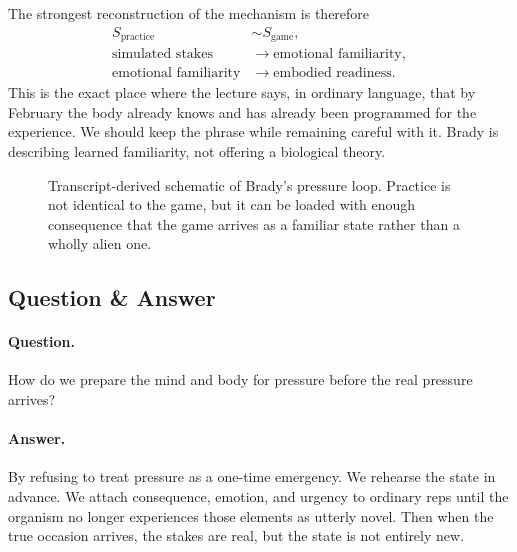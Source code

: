 The strongest reconstruction of the mechanism is therefore
\begin{align}
S_{\text{practice}} &\sim S_{\text{game}},\\
\text{simulated stakes} &\to \text{emotional familiarity},\\
\text{emotional familiarity} &\to \text{embodied readiness}.
\end{align}
This is the exact place where the lecture says, in ordinary language, that by February the body already knows and has already been programmed for the experience. We should keep the phrase while remaining careful with it. Brady is describing learned familiarity, not offering a biological theory.

\begin{figure}[h]
\centering
{}
\caption{Transcript-derived schematic of Brady's pressure loop. Practice is not identical to the game, but it can be loaded with enough consequence that the game arrives as a familiar state rather than a wholly alien one.}
\end{figure}

\subsection{Question \& Answer}

\paragraph{Question.} How do we prepare the mind and body for pressure before the real pressure arrives?

\paragraph{Answer.} By refusing to treat pressure as a one-time emergency. We rehearse the state in advance. We attach consequence, emotion, and urgency to ordinary reps until the organism no longer experiences those elements as utterly novel. Then when the true occasion arrives, the stakes are real, but the state is not entirely new.

